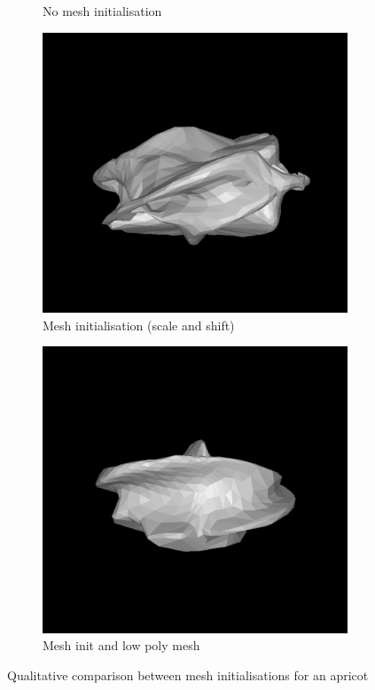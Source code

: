 \documentclass{article}
\begin{document}
\begin{figure}[h!]
\begin{subfigure}{.2\textwidth}
    \caption{No mesh initialisation}
    \label{results-apricot-mesh2}
  \end{subfigure}
  \hfill
  \begin{subfigure}{.2\textwidth}
    \centering
    \includegraphics[width=\textwidth]{images/apricotmesh_b.png}
    \caption{Mesh initialisation (scale and shift)}
    \label{results-apricot-mesh3}
  \end{subfigure}
  \hfill
  \begin{subfigure}{.2\textwidth}
    \centering
    \includegraphics[width=\textwidth]{images/apricotmesh_c.png}
    \caption{Mesh init and low poly mesh}
    \label{results-apricot-png}
  \end{subfigure}
  \caption{Qualitative comparison between mesh initialisations for an apricot}
  \label{results-apricot}
\end{figure}
\end{document}
